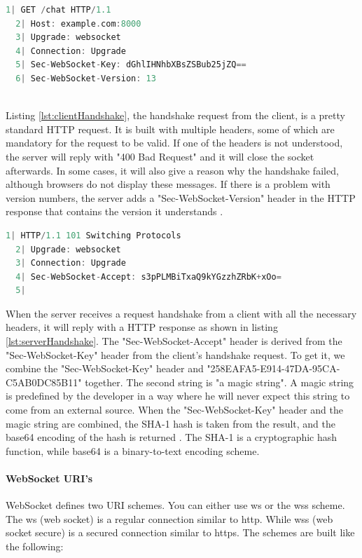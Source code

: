 \documentclass[a4paper, 11pt]{report}
\begin{document}
	\begin{lstlisting}[caption={Client's request for websocket handshake},captionpos=b, label={lst:clientHandshake}, language=c, float=h]
  1| GET /chat HTTP/1.1
  2| Host: example.com:8000
  3| Upgrade: websocket
  4| Connection: Upgrade
  5| Sec-WebSocket-Key: dGhlIHNhbXBsZSBub25jZQ==
  6| Sec-WebSocket-Version: 13
	\end{lstlisting}\\
Listing \ref{lst:clientHandshake}, the handshake request from the client, is a pretty standard HTTP request. It is built with multiple headers, some of which are mandatory for the request to be valid. If one of the headers is not understood, the server will reply with "400 Bad Request" and it will close the socket afterwards. In some cases, it will also give a reason why the handshake failed, although browsers do not display these messages. If there is a problem with version numbers, the server adds a "Sec-WebSocket-Version" header in the HTTP response that contains the version it understands \cite{BadRequest}.
	\begin{lstlisting}[caption={Server's response for websocket handshake},captionpos=b, label={lst:serverHandshake}, language=c, float=h]
  1| HTTP/1.1 101 Switching Protocols
  2| Upgrade: websocket
  3| Connection: Upgrade
  4| Sec-WebSocket-Accept: s3pPLMBiTxaQ9kYGzzhZRbK+xOo=
  5|
	\end{lstlisting}
When the server receives a request handshake from a client with all the necessary headers, it will reply with a HTTP response as shown in listing \ref{lst:serverHandshake}. The "Sec-WebSocket-Accept" header is derived from the "Sec-WebSocket-Key" header from the client's handshake request. To get it, we combine the "Sec-WebSocket-Key" header and "258EAFA5-E914-47DA-95CA-C5AB0DC85B11" together. The second string is "a magic string". A magic string is predefined by the developer in a way where he will never expect this string to come from an external source. When the "Sec-WebSocket-Key" header and the magic string are combined, the SHA-1 hash is taken from the result, and the base64 encoding of the hash is returned \cite{BadRequest}. The SHA-1 is a cryptographic hash function, while base64 is a binary-to-text encoding scheme.

		\paragraph{WebSocket URI's}
WebSocket defines two URI schemes. You can either use ws or the wss scheme. The ws (web socket) is a regular connection similar to http. While wss (web socket secure) is a secured connection similar to https. The schemes are built like the following:\\
\end{document}
